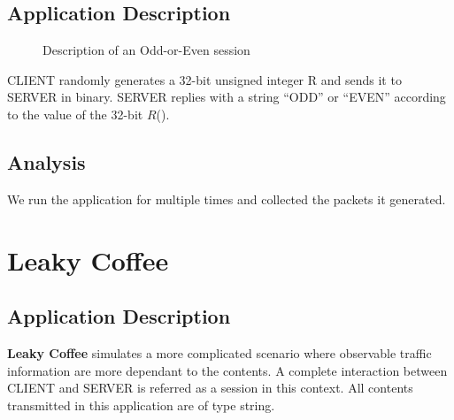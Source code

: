 \subsection{Application Description}

\begin{figure}[H] 
\centering
\resizebox{8cm}{!}
{}
\caption{Description of an Odd-or-Even session}
\label{Fig: Odd or Even}
\end{figure}

CLIENT randomly generates a 32-bit unsigned integer R and sends it to SERVER in binary. SERVER replies with a string “ODD'' or “EVEN” according to the value of the 32-bit $R$().

\subsection{Analysis}
We run the application for multiple times and collected the packets it generated.

%
%
%
%
%

\section{Leaky Coffee}
\label{Sec: Leaky Coffee}

\subsection{Application Description}
\textbf{Leaky Coffee} simulates a more complicated scenario where observable traffic information are more dependant to the contents. A complete interaction between CLIENT and SERVER is referred as a session in this context. All contents transmitted in this application are of type string.

